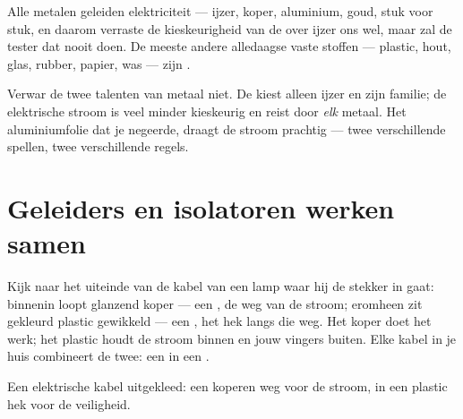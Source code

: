 \begin{proposition}\label{prop:g4:conductors-insulators:metals}
Alle metalen geleiden elektriciteit --- ijzer, koper, aluminium, goud,
stuk voor stuk, en daarom verraste de kieskeurigheid van de
 over ijzer ons wel, maar zal de tester dat nooit doen. De
meeste andere alledaagse vaste stoffen --- plastic, hout, glas,
rubber, papier, was --- zijn .
\end{proposition}

\begin{remark}\label{rem:g4:conductors-insulators:notmagnet}
Verwar de twee talenten van metaal niet. De  kiest alleen ijzer
en zijn familie; de elektrische stroom is veel minder kieskeurig en
reist door \emph{elk} metaal. Het aluminiumfolie dat je 
negeerde, draagt de stroom prachtig --- twee verschillende spellen,
twee verschillende regels.
\end{remark}

\section{Geleiders en isolatoren werken samen}

\begin{example}\label{ex:g4:conductors-insulators:wire}
Kijk naar het uiteinde van de kabel van een lamp waar hij de stekker
in gaat: binnenin loopt glanzend koper --- een , de weg van de
stroom; eromheen zit gekleurd plastic gewikkeld --- een
, het hek langs die weg. Het koper doet het werk; het plastic
houdt de stroom binnen en jouw vingers buiten. Elke kabel in je huis
combineert de twee: een  in een .
\end{example}

\begin{omfigure}

{\small Een elektrische kabel uitgekleed: een koperen weg voor de
stroom, in een plastic hek voor de veiligheid.}
\end{omfigure}

